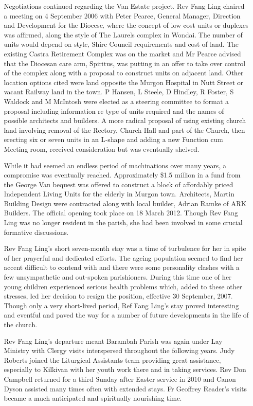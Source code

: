 Negotiations continued regarding the Van Estate project. Rev Fang Ling chaired a meeting on 4 September 2006 with Peter Pearce, General Manager, Direction and Development for the Diocese, where the concept of low-cost units or duplexes was affirmed, along the style of The Laurels complex in Wondai. The number of units would depend on style, Shire Council requirements and cost of land. The existing Castra Retirement Complex was on the market and Mr Pearce advised that the Diocesan care arm, Spiritus, was putting in an offer to take over control of the complex along with a proposal to construct units on adjacent land. Other location options cited were land opposite the Murgon Hospital in Nutt Street or vacant Railway land in the town. P Hansen, L Steele, D Hindley, R Foster, S Waldock and M McIntosh were elected as a steering committee to format a proposal including information re type of units required and the names of possible architects and builders. A more radical proposal of using existing church land involving removal of the Rectory, Church Hall and part of the Church, then erecting six or seven units in an L-shape and adding a new Function cum Meeting room, received consideration but was eventually shelved.

While it had seemed an endless period of machinations over many years, a compromise was eventually reached. Approximately \$1.5 million in a fund from the George Van bequest was offered to construct a block of affordably priced Independent Living Units for the elderly in Murgon town. Architects, Martin Building Design were contracted along with local builder, Adrian Ramke of ARK Builders. The official opening took place on 18 March 2012. Though Rev Fang Ling was no longer resident in the parish, she had been involved in some crucial formative discussions.

Rev Fang Ling's short seven-month stay was a time of turbulence for her in spite of her prayerful and dedicated efforts. The ageing population seemed to find her accent difficult to contend with and there were some personality clashes with a few unsympathetic and out-spoken parishioners. During this time one of her young children experienced serious health problems which, added to these other stresses, led her decision to resign the position, effective 30 September, 2007. Though only a very short-lived period, Ref Fang Ling's stay proved interesting and eventful and paved the way for a number of future developments in the life of the church.

Rev Fang Ling's departure meant Barambah Parish was again under Lay Ministry with Clergy visits interspersed throughout the following years. Judy Roberts joined the Liturgical Assistants team providing great assistance, especially to Kilkivan with her youth work there and in taking services. Rev Don Campbell returned for a third Sunday after Easter service in 2010 and Canon Dyson assisted many times often with extended stays. Fr Geoffrey Reader's visits became a much anticipated and spiritually nourishing time.

